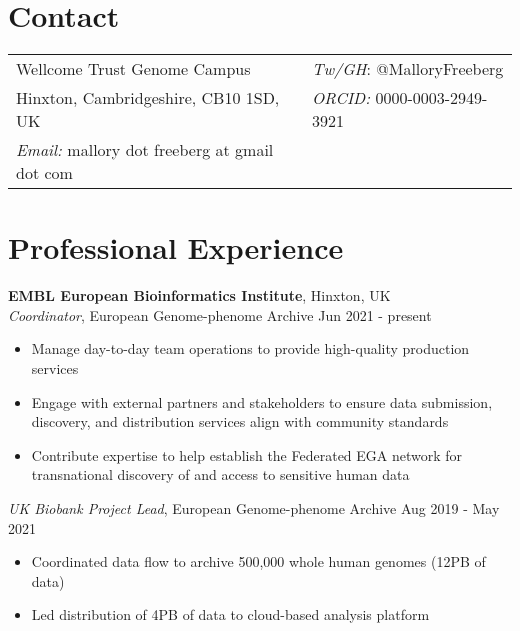 \documentclass[margin,line]{res}
\begin{document}

\begin{resume}
\section{\sc Contact}
\begin{tabular}{@{}p{3in}p{2.5in}}
Wellcome Trust Genome Campus & {\it Tw/GH}: @MalloryFreeberg \\
Hinxton, Cambridgeshire, CB10 1SD, UK &  {\it ORCID:} 0000-0003-2949-3921 \\
 {\it Email:}  mallory dot freeberg at gmail dot com &
\end{tabular}



\section{\sc Professional Experience}
{\bf EMBL European Bioinformatics Institute}, Hinxton, UK\\
{\em Coordinator}, European Genome-phenome Archive \hfill {Jun 2021 - present}
\begin{itemize}
\itemsep0em 
	\item Manage day-to-day team operations to provide high-quality production services
	\item Engage with external partners and stakeholders to ensure data submission, discovery, and distribution services align with community standards
	\item Contribute expertise to help establish the Federated EGA network for transnational discovery of and access to sensitive human data
\end{itemize}

{\em UK Biobank Project Lead}, European Genome-phenome Archive \hfill {Aug 2019 - May 2021}
\begin{itemize}
\itemsep0em 
	\item Coordinated data flow to archive 500,000 whole human genomes (12PB of data)
	\item Led distribution of 4PB of data to cloud-based analysis platform
\end{itemize}


\end{resume}
\end{document}
